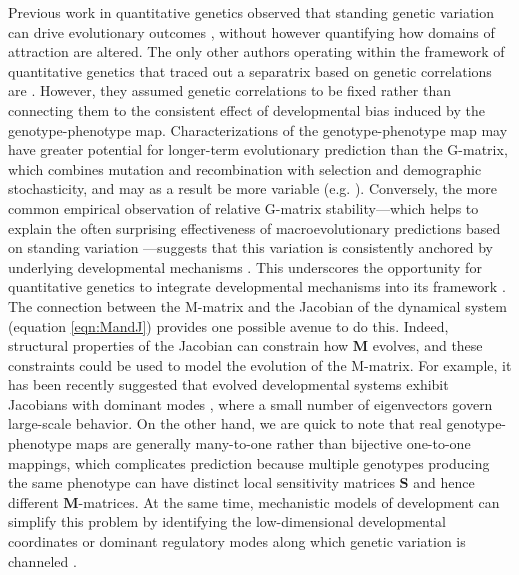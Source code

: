  Previous work in quantitative genetics observed that standing genetic variation can drive evolutionary outcomes \parencite{steppan2002comparative, melo2016modularity}, without however quantifying how domains of attraction are altered.
 The only other authors operating within the framework of quantitative genetics that traced out a separatrix based on genetic correlations are \cite{price1993peak}.
 However, they assumed genetic correlations to be fixed rather than connecting them to the consistent effect of developmental bias induced by the genotype-phenotype map.
 Characterizations of the genotype-phenotype map may have greater potential for longer-term evolutionary prediction than the G-matrix, which combines mutation and recombination with selection and demographic stochasticity, and may as a result be more variable (e.g. \cite{bjorklund2013rapid, cai2025disentangling}).
 Conversely, the more common empirical observation of relative G-matrix stability---which helps to explain the often surprising effectiveness of macroevolutionary predictions based on standing variation \parencite{Tsuboi2024-gm}---suggests that this variation is consistently anchored by underlying developmental mechanisms \parencite{cai2025disentangling}.
 This underscores the opportunity for quantitative genetics to integrate developmental mechanisms into its framework \parencite{hansen2008macroevolutionary, milocco2026bridging}.
 The connection between the M-matrix and the Jacobian of the dynamical system (equation \ref{eqn:MandJ}) provides one possible avenue to do this.
 Indeed, structural properties of the Jacobian can constrain how $\mathbf{M}$ evolves, and these constraints could be used to model the evolution of the M-matrix.
 For example, it has been recently suggested that evolved developmental systems exhibit Jacobians with dominant modes \parencite{russo2025soft, milocco2026bridging, furusawa2018formation}, where a small number of eigenvectors govern large-scale behavior.
 On the other hand, we are quick to note that real genotype-phenotype maps are generally many-to-one rather than bijective one-to-one mappings, which complicates prediction because multiple genotypes producing the same phenotype can have distinct local sensitivity matrices $\mathbf{S}$ and hence different $\mathbf{M}$-matrices.
 At the same time, mechanistic models of development can simplify this problem by identifying the low-dimensional developmental coordinates or dominant regulatory modes along which genetic variation is channeled \parencite{gonzalez2024mathematical}.

